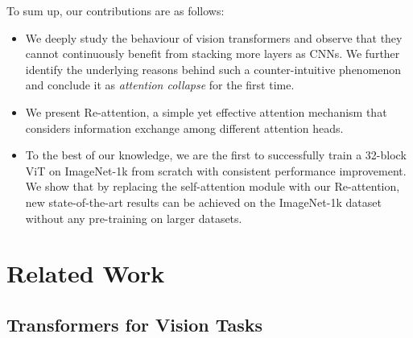 \documentclass[10pt,twocolumn,letterpaper]{article}
\newcommand{\nameofatten}{Re-attention}
\begin{document}
To sum up, our contributions are as follows:
\begin{itemize}
    \setlength\itemsep{0em}
    \item We deeply study the behaviour of vision transformers
    and observe that they cannot continuously benefit from stacking more layers as CNNs. We further identify the underlying reasons behind such a counter-intuitive phenomenon and conclude it as \emph{attention collapse} for the first time.


    \item We present \nameofatten{}, a simple yet effective attention mechanism
    that considers information exchange among different attention heads.


    \item To the best of our knowledge, we are the first to successfully train a 32-block ViT
    on ImageNet-1k from scratch with consistent performance improvement.
    We show that by replacing the self-attention module with our \nameofatten{}, 
    new state-of-the-art results can be achieved on the ImageNet-1k dataset 
    without any pre-training on larger datasets.
\end{itemize} \section{Related Work}
\subsection{Transformers for Vision Tasks}
\end{document}
